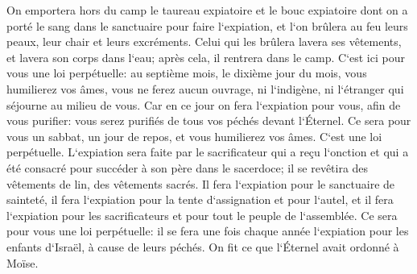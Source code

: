 \verse On emportera hors du camp le taureau expiatoire et le bouc expiatoire dont on a porté le sang dans le sanctuaire pour faire l`expiation, et l`on brûlera au feu leurs peaux, leur chair et leurs excréments. 
\verse Celui qui les brûlera lavera ses vêtements, et lavera son corps dans l`eau; après cela, il rentrera dans le camp. 
\verse C`est ici pour vous une loi perpétuelle: au septième mois, le dixième jour du mois, vous humilierez vos âmes, vous ne ferez aucun ouvrage, ni l`indigène, ni l`étranger qui séjourne au milieu de vous. 
\verse Car en ce jour on fera l`expiation pour vous, afin de vous purifier: vous serez purifiés de tous vos péchés devant l`Éternel. 
\verse Ce sera pour vous un sabbat, un jour de repos, et vous humilierez vos âmes. C`est une loi perpétuelle. 
\verse L`expiation sera faite par le sacrificateur qui a reçu l`onction et qui a été consacré pour succéder à son père dans le sacerdoce; il se revêtira des vêtements de lin, des vêtements sacrés. 
\verse Il fera l`expiation pour le sanctuaire de sainteté, il fera l`expiation pour la tente d`assignation et pour l`autel, et il fera l`expiation pour les sacrificateurs et pour tout le peuple de l`assemblée. 
\verse Ce sera pour vous une loi perpétuelle: il se fera une fois chaque année l`expiation pour les enfants d`Israël, à cause de leurs péchés. On fit ce que l`Éternel avait ordonné à Moïse. 

\chapter{}

